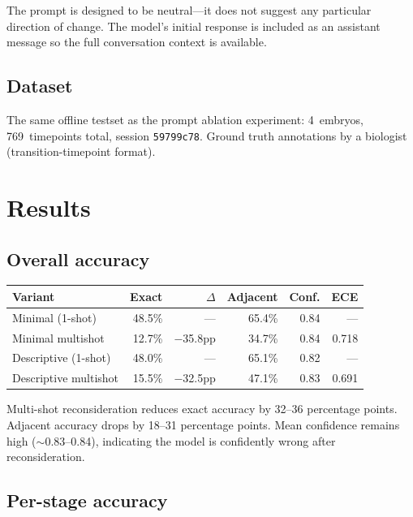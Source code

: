 \documentclass[11pt, a4paper]{article}
\begin{document}
The prompt is designed to be neutral---it does not suggest any particular
direction of change.  The model's initial response is included as an assistant
message so the full conversation context is available.

\subsection{Dataset}

The same offline testset as the prompt ablation experiment:
4~embryos, 769~timepoints total, session \texttt{59799c78}.
Ground truth annotations by a biologist (transition-timepoint format).

\section{Results}

\subsection{Overall accuracy}

\begin{center}
\begin{tabular}{@{}lrrrrr@{}}
\toprule
\textbf{Variant} & \textbf{Exact} & \textbf{$\Delta$} & \textbf{Adjacent} & \textbf{Conf.} & \textbf{ECE} \\
\midrule
Minimal (1-shot)      & 48.5\% & ---           & 65.4\% & 0.84 & --- \\
Minimal multishot     & 12.7\% & \textcolor{neg}{$-$35.8pp} & 34.7\% & 0.84 & 0.718 \\
\addlinespace
Descriptive (1-shot)  & 48.0\% & ---           & 65.1\% & 0.82 & --- \\
Descriptive multishot & 15.5\% & \textcolor{neg}{$-$32.5pp} & 47.1\% & 0.83 & 0.691 \\
\bottomrule
\end{tabular}
\end{center}

Multi-shot reconsideration reduces exact accuracy by 32--36 percentage points.
Adjacent accuracy drops by 18--31 percentage points.  Mean confidence remains
high ($\sim$0.83--0.84), indicating the model is confidently wrong after
reconsideration.

\subsection{Per-stage accuracy}
\end{document}
